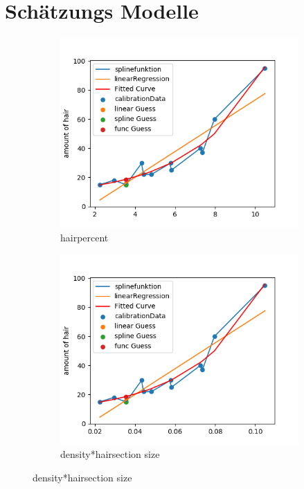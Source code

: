 \documentclass[german,a4paper, 12pt]{llncs}
\begin{document}
\section{Schätzungs Modelle}
\label{appendix:modelle}
\begin{figure}[H] %
\begin{subfigure}{0.48\textwidth}
	\includegraphics[width=1.1\linewidth]{fig64/g01_hairpercent.png}
	\caption{hairpercent} \label{fig:a}
\end{subfigure}\hspace*{\fill}
\begin{subfigure}{0.48\textwidth}
	\includegraphics[width=1.1\linewidth]{fig64/g02_densitynorm.png}
	\caption{density*hairsection size} \label{fig:b}
\end{subfigure}


\end{figure}
\end{document}
